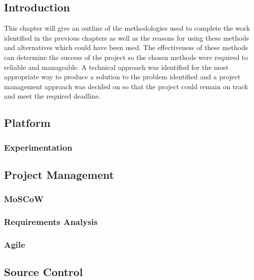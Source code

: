 \subsection{Introduction}
This chapter will give an outline of the methodologies used to complete the work identified in the previous chapters as well as the reasons for using these methods and alternatives which could have been used. The effectiveness of these methods can determine the success of the project so the chosen methods were required to reliable and manageable. A technical approach was identified for the most appropriate way to produce a solution to the problem identified and a project management approach was decided on so that the project could remain on track and meet the required deadline.
\subsection{Platform}
\subsubsection{Experimentation}
\subsection{Project Management}
\subsubsection{MoSCoW}
\subsubsection{Requirements Analysis}
\subsubsection{Agile}
\subsection{Source Control}